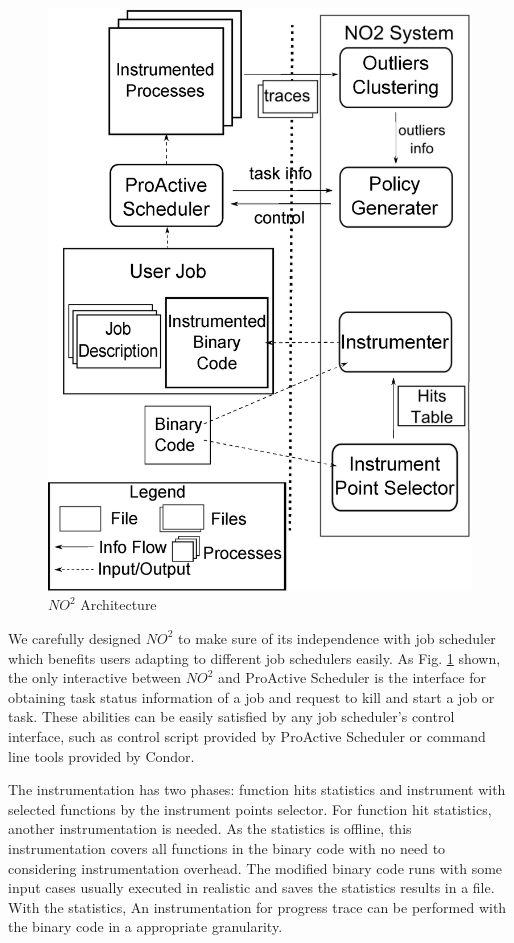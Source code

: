 \begin{figure}
\centering
\includegraphics[width=0.9\columnwidth]{figures/NO2_arch.eps}
\caption{$NO^2$ Architecture}
\label{figure:no2arch}
\end{figure}

We carefully designed $NO^2$ to make sure of its independence with job scheduler which benefits users adapting to different job schedulers easily. As Fig. \ref{figure:no2arch} shown, the only interactive between $NO^2$ and ProActive Scheduler is the interface for obtaining task status information of a job and request to kill and start a job or task. These abilities can be easily satisfied by any job scheduler's control interface, such as control script provided by ProActive Scheduler or command line tools provided by Condor.

The instrumentation has two phases: function hits statistics and instrument with selected functions by the instrument points selector. For function hit statistics, another instrumentation is needed. As the statistics is offline, this instrumentation covers all functions in the binary code with no need to considering instrumentation overhead. The modified binary code runs with some input cases usually executed in realistic and saves the statistics results in a file. With the statistics, An instrumentation for progress trace can be performed with the binary code in a appropriate granularity.

